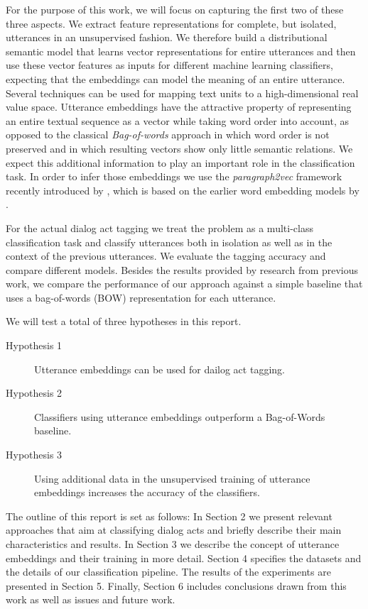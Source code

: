For the purpose of this work, we will focus on capturing the first two of these three aspects. We extract feature representations for complete, but isolated, utterances in an unsupervised fashion.
We therefore build a distributional semantic model that learns vector representations for entire utterances and then use these vector features as inputs for different machine learning classifiers, expecting that the embeddings can model the meaning of an entire utterance.
Several techniques can be used for mapping text units to a high-dimensional real value space.
Utterance embeddings have the attractive property of representing an entire textual sequence as a vector while taking word order into account, as opposed to the classical \emph{Bag-of-words} approach in which word order is not preserved and in which resulting vectors show only little semantic relations.
We expect this additional information to play an important role in the classification task. In order to infer those embeddings we use the \emph{paragraph2vec} framework recently introduced by , which is based on the earlier word embedding models by .

For the actual dialog act tagging we treat the problem as a multi-class classification task and classify utterances both in isolation as well as in the context of the previous utterances.
We evaluate the tagging accuracy and compare different models.
Besides the results provided by research from previous work, we compare the performance of our approach against a simple baseline that uses a bag-of-words (BOW) representation for each utterance. 

We will test a total of three hypotheses in this report.
\begin{description}
	\item[Hypothesis 1] Utterance embeddings can be used for dailog act tagging.
	\item[Hypothesis 2] Classifiers using utterance embeddings outperform a Bag-of-Words baseline.
	\item[Hypothesis 3] Using additional data in the unsupervised training of utterance embeddings increases the accuracy of the classifiers.
\end{description}

The outline of this report is set as follows: In Section 2 we present relevant approaches that aim at classifying dialog acts and briefly describe their main characteristics and results. In Section 3 we describe the concept of utterance embeddings and their training in more detail. Section 4 specifies the datasets and the details of our classification pipeline. The results of the experiments are presented in Section 5. Finally, Section 6 includes conclusions drawn from this work as well as issues and future work.
